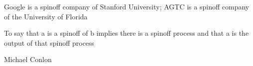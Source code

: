 \documentclass[letterpaper,10pt,english]{sphinxmanual}
\begin{document}
\begin{sphinxShadowBox}

\sphinxAtStartPar
{\hyperref[\detokenize{doc-ORG_0000001::doc}]{}}
\end{sphinxShadowBox}

\begin{sphinxShadowBox}

\sphinxAtStartPar
{\hyperref[\detokenize{doc-ORG_0000001::doc}]{}}
\end{sphinxShadowBox}

\begin{sphinxShadowBox}

\sphinxAtStartPar
{\hyperref[\detokenize{doc-ORG_2000013::doc}]{}}
\end{sphinxShadowBox}

\begin{sphinxShadowBox}

\sphinxAtStartPar
Google is a spin\sphinxhyphen{}off company of Stanford University; AGTC is a spin\sphinxhyphen{}off company of the University of Florida
\end{sphinxShadowBox}

\begin{sphinxShadowBox}

\sphinxAtStartPar
To say that a is a spin\sphinxhyphen{}off of b implies there is a spin\sphinxhyphen{}off process and that a is the output of that spin\sphinxhyphen{}off process
\end{sphinxShadowBox}

\begin{sphinxShadowBox}

\sphinxAtStartPar
Michael Conlon 
\end{sphinxShadowBox}
\begin{quote}

\ignorespaces \end{quote}
\end{document}
